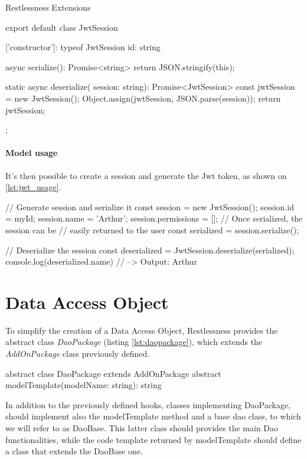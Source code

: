 \begin{chapter}{Restlessness Extensions}
    \bigskip
    \begin{code}[caption=A JwtSession class created by the auth-jwt package, label={lst:new_model_auth}]
export default class JwtSession {
  ['constructor']: typeof JwtSession
  id: string

  async serialize(): Promise<string> {
    return JSON.stringify(this);
  }

  static async deserialize(
      session: string): Promise<JwtSession> {
    const jwtSession = new JwtSession();
    Object.assign(jwtSession, JSON.parse(session));
    return jwtSession;
  }
};
    \end{code}

    \paragraph{Model usage}
    It's then possible to create a session and generate the Jwt token, as shown
    on \ref{lst:jwt_usage}.

    \bigskip
    \begin{code}[caption=User model usage, label={lst:jwt_usage}]
// Generate session and serialize it
const session = new JwtSession();
session.id = myId;
session.name = 'Arthur';
session.permissions = [];
// Once serialized, the session can be
// easily returned to the user
const serialized = session.serialize();

// Deserialize the session
const deserialized = JwtSession.deserialize(serialized);
console.log(deserialized.name) // --> Output: Arthur
    \end{code}

    \section{Data Access Object}
    \label{sec:data_access_object}

    To simplify the creation of a Data Access Object, Restlessness provides the
    abstract class \textit{DaoPackage} (listing \ref{lst:daopackage}), which extends
    the \textit{AddOnPackage} class previously defined.

    \bigskip
    \begin{code}[caption=DaoPackage class definition, label={lst:daopackage}]
abstract class DaoPackage extends AddOnPackage {
    abstract modelTemplate(modelName: string): string
}
    \end{code}

    In addition to the previously defined hooks, classes implementing DaoPackage,
    should implement also the modelTemplate method and a base dao class, to which
    we will refer to as DaoBase. This latter class should provides the main Dao
    functionalities, while the code template returned by modelTemplate should define
    a class that extends the DaoBase one.


\end{chapter}
